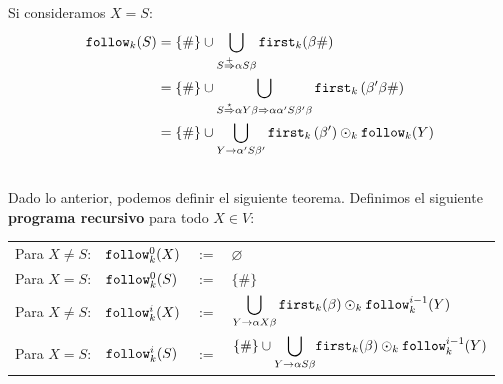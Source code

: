 Si consideramos $X = S$:
\begin{align*}
    \texttt{follow}_k(S) & =\{\#\} \cup \bigcup_{S\stackrel{+}{\Rightarrow} \alpha S \beta} \texttt{first}_k(\beta \#)                                                                                          \\
                 & =\{\#\} \cup \bigcup_{S \stackrel{\star}{\Rightarrow} \alpha Y \beta \Rightarrow \alpha \alpha^{\prime} S \beta^{\prime} \beta} \texttt{first}_k\left(\beta^{\prime} \beta \#\right) \\
                 & =\{\#\} \cup \bigcup_{Y \rightarrow \alpha^{\prime} S \beta^{\prime}} \texttt{first}{ }_k\left(\beta^{\prime}\right) \odot_k \texttt{follow}_k(Y)                                            \\
                 &
\end{align*}
Dado lo anterior, podemos definir el siguiente teorema.
Definimos el siguiente \textbf{programa recursivo} para todo $X \in V$:
\begin{table}[H]
    \centering
    \begin{tabular}{llll}
        Para $X \neq S$: & $\texttt{follow}_k^0(X)$ & $:=$ & $\varnothing$                                                                                                            \\
        Para $X = S$:    & $\texttt{follow}_k^0(S)$ & $:=$ & $\{\#\}$                                                                                                                 \\
        Para $X \neq S$: & $\texttt{follow}_k^i(X)$ & $:=$ & $\displaystyle{\bigcup_{Y \rightarrow \alpha X \beta} \texttt{first}_k(\beta) \odot_k \texttt{follow}_k^{i-1}(Y)}$                       \\
        Para $X = S$:    & $\texttt{follow}_k^i(S)$ & $:=$ & $\displaystyle{\{\#\} \cup \underset{Y \rightarrow \alpha S \beta}{\bigcup} \texttt{first}_k(\beta) \odot_k \texttt{follow}_k^{i-1}(Y)}$
    \end{tabular}
\end{table}

